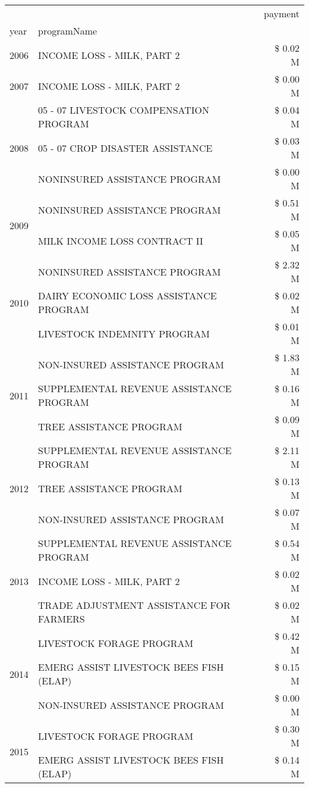 \begin{tabular}{llr}
\toprule
 &  & payment \\
year & programName &  \\
\midrule
2006 & INCOME LOSS - MILK, PART 2 & \$ 0.02 M \\
\cline{1-3}
2007 & INCOME LOSS - MILK, PART 2 & \$ 0.00 M \\
\cline{1-3}
\multirow[t]{3}{*}{2008} & 05 - 07 LIVESTOCK COMPENSATION PROGRAM & \$ 0.04 M \\
 & 05 - 07 CROP DISASTER ASSISTANCE & \$ 0.03 M \\
 & NONINSURED ASSISTANCE PROGRAM & \$ 0.00 M \\
\cline{1-3}
\multirow[t]{2}{*}{2009} & NONINSURED ASSISTANCE PROGRAM & \$ 0.51 M \\
 & MILK INCOME LOSS CONTRACT II & \$ 0.05 M \\
\cline{1-3}
\multirow[t]{3}{*}{2010} & NONINSURED ASSISTANCE PROGRAM & \$ 2.32 M \\
 & DAIRY ECONOMIC LOSS ASSISTANCE PROGRAM & \$ 0.02 M \\
 & LIVESTOCK INDEMNITY PROGRAM & \$ 0.01 M \\
\cline{1-3}
\multirow[t]{3}{*}{2011} & NON-INSURED ASSISTANCE PROGRAM & \$ 1.83 M \\
 & SUPPLEMENTAL REVENUE ASSISTANCE PROGRAM & \$ 0.16 M \\
 & TREE ASSISTANCE PROGRAM & \$ 0.09 M \\
\cline{1-3}
\multirow[t]{3}{*}{2012} & SUPPLEMENTAL REVENUE ASSISTANCE PROGRAM & \$ 2.11 M \\
 & TREE ASSISTANCE PROGRAM & \$ 0.13 M \\
 & NON-INSURED ASSISTANCE PROGRAM & \$ 0.07 M \\
\cline{1-3}
\multirow[t]{3}{*}{2013} & SUPPLEMENTAL REVENUE ASSISTANCE PROGRAM & \$ 0.54 M \\
 & INCOME LOSS - MILK, PART 2 & \$ 0.02 M \\
 & TRADE ADJUSTMENT ASSISTANCE FOR FARMERS & \$ 0.02 M \\
\cline{1-3}
\multirow[t]{3}{*}{2014} & LIVESTOCK FORAGE PROGRAM & \$ 0.42 M \\
 & EMERG ASSIST LIVESTOCK BEES FISH (ELAP) & \$ 0.15 M \\
 & NON-INSURED ASSISTANCE PROGRAM & \$ 0.00 M \\
\cline{1-3}
\multirow[t]{3}{*}{2015} & LIVESTOCK FORAGE PROGRAM & \$ 0.30 M \\
 & EMERG ASSIST LIVESTOCK BEES FISH (ELAP) & \$ 0.14 M \\

\end{tabular}
